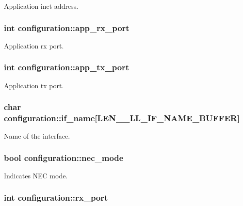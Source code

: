 \-Application inet address. \hypertarget{structconfiguration_a89303758b5819edf998f2e2f6b075216}{
\subsubsection[{app\-\_\-rx\-\_\-port}]{\setlength{\rightskip}{0pt plus 5cm}int {\bf configuration\-::app\-\_\-rx\-\_\-port}}}\label{structconfiguration_a89303758b5819edf998f2e2f6b075216}
\-Application rx port. \hypertarget{structconfiguration_af7620150c992aa51a8fc9133036c97bd}{
\subsubsection[{app\-\_\-tx\-\_\-port}]{\setlength{\rightskip}{0pt plus 5cm}int {\bf configuration\-::app\-\_\-tx\-\_\-port}}}\label{structconfiguration_af7620150c992aa51a8fc9133036c97bd}
\-Application tx port. \hypertarget{structconfiguration_a6fb72672d5c6714cbea3b62025aa7c12}{
\subsubsection[{if\-\_\-name}]{\setlength{\rightskip}{0pt plus 5cm}char {\bf configuration\-::if\-\_\-name}\mbox{[}\-L\-E\-N\-\_\-\-\_\-\-L\-L\-\_\-\-I\-F\-\_\-\-N\-A\-M\-E\-\_\-\-B\-U\-F\-F\-E\-R\mbox{]}}}\label{structconfiguration_a6fb72672d5c6714cbea3b62025aa7c12}
\-Name of the interface. \hypertarget{structconfiguration_abe68f6a23eea6d488a7aadf74ed9e9df}{
\subsubsection[{nec\-\_\-mode}]{\setlength{\rightskip}{0pt plus 5cm}bool {\bf configuration\-::nec\-\_\-mode}}}\label{structconfiguration_abe68f6a23eea6d488a7aadf74ed9e9df}
\-Indicates \-N\-E\-C mode. \hypertarget{structconfiguration_a8da9b0ad2f0b9fc5e3e742c4554d79e6}{
\subsubsection[{rx\-\_\-port}]{\setlength{\rightskip}{0pt plus 5cm}int {\bf configuration\-::rx\-\_\-port}}}\label{structconfiguration_a8da9b0ad2f0b9fc5e3e742c4554d79e6}
